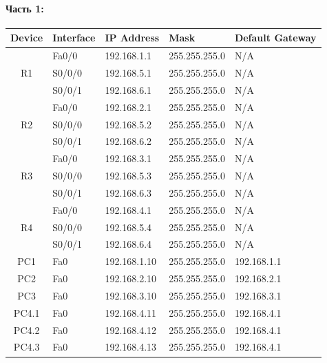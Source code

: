 \paragraph{Часть 1:}
\begin{center}
    \begin{tabular}{|c|l|l|l|l|}
        \hline
        Device              & Interface & IP Address   & Mask          & Default Gateway \\
        \hline
        \multirow{3}{*}{R1} & Fa0/0     & 192.168.1.1  & 255.255.255.0 & N/A             \\
        \cline{2-5}
        ~                   & S0/0/0    & 192.168.5.1  & 255.255.255.0 & N/A             \\
        \cline{2-5}
        ~                   & S0/0/1    & 192.168.6.1  & 255.255.255.0 & N/A             \\
        \hline
        \multirow{3}{*}{R2} & Fa0/0     & 192.168.2.1  & 255.255.255.0 & N/A             \\
        \cline{2-5}
        ~                   & S0/0/0    & 192.168.5.2  & 255.255.255.0 & N/A             \\
        \cline{2-5}
        ~                   & S0/0/1    & 192.168.6.2  & 255.255.255.0 & N/A             \\
        \hline
        \multirow{3}{*}{R3} & Fa0/0     & 192.168.3.1  & 255.255.255.0 & N/A             \\
        \cline{2-5}
        ~                   & S0/0/0    & 192.168.5.3  & 255.255.255.0 & N/A             \\
        \cline{2-5}
        ~                   & S0/0/1    & 192.168.6.3  & 255.255.255.0 & N/A             \\
        \hline
        \multirow{3}{*}{R4} & Fa0/0     & 192.168.4.1  & 255.255.255.0 & N/A             \\
        \cline{2-5}
        ~                   & S0/0/0    & 192.168.5.4  & 255.255.255.0 & N/A             \\
        \cline{2-5}
        ~                   & S0/0/1    & 192.168.6.4  & 255.255.255.0 & N/A             \\
        \hline
        PC1                 & Fa0       & 192.168.1.10 & 255.255.255.0 & 192.168.1.1     \\
        \hline
        PC2                 & Fa0       & 192.168.2.10 & 255.255.255.0 & 192.168.2.1     \\
        \hline
        PC3                 & Fa0       & 192.168.3.10 & 255.255.255.0 & 192.168.3.1     \\
        \hline
        PC4.1               & Fa0       & 192.168.4.11 & 255.255.255.0 & 192.168.4.1     \\
        \hline
        PC4.2               & Fa0       & 192.168.4.12 & 255.255.255.0 & 192.168.4.1     \\
        \hline
        PC4.3               & Fa0       & 192.168.4.13 & 255.255.255.0 & 192.168.4.1     \\
        \hline
    \end{tabular}
\end{center}

